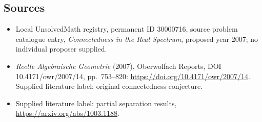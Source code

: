 \documentclass[11pt]{article}
\begin{document}
\subsection{Sources}
\begin{itemize}\item Local UnsolvedMath registry, permanent ID 30000716, source problem catalogue entry, \emph{Connectedness in the Real Spectrum}, proposed year 2007; no individual proposer supplied.\item \emph{Reelle Algebraische Geometrie} (2007), Oberwolfach Reports, DOI 10.4171/owr/2007/14, pp.\ 753--820: \url{https://doi.org/10.4171/owr/2007/14}. Supplied literature label: original connectedness conjecture.\item Supplied literature label: partial separation results, \url{https://arxiv.org/abs/1003.1188}.\end{itemize}
\end{document}
